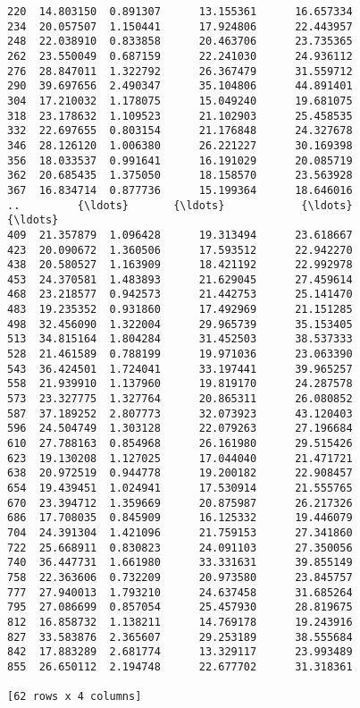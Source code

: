 \documentclass[11pt]{article}
\begin{document}
\begin{Verbatim}[commandchars=\\\{\}]
220  14.803150  0.891307      13.155361      16.657334
234  20.057507  1.150441      17.924806      22.443957
248  22.038910  0.833858      20.463706      23.735365
262  23.550049  0.687159      22.241030      24.936112
276  28.847011  1.322792      26.367479      31.559712
290  39.697656  2.490347      35.104806      44.891401
304  17.210032  1.178075      15.049240      19.681075
318  23.178632  1.109523      21.102903      25.458535
332  22.697655  0.803154      21.176848      24.327678
346  28.126120  1.006380      26.221227      30.169398
356  18.033537  0.991641      16.191029      20.085719
362  20.685435  1.375050      18.158570      23.563928
367  16.834714  0.877736      15.199364      18.646016
..         {\ldots}       {\ldots}            {\ldots}            {\ldots}
409  21.357879  1.096428      19.313494      23.618667
423  20.090672  1.360506      17.593512      22.942270
438  20.580527  1.163909      18.421192      22.992978
453  24.370581  1.483893      21.629045      27.459614
468  23.218577  0.942573      21.442753      25.141470
483  19.235352  0.931860      17.492969      21.151285
498  32.456090  1.322004      29.965739      35.153405
513  34.815164  1.804284      31.452503      38.537333
528  21.461589  0.788199      19.971036      23.063390
543  36.424501  1.724041      33.197441      39.965257
558  21.939910  1.137960      19.819170      24.287578
573  23.327775  1.327764      20.865311      26.080852
587  37.189252  2.807773      32.073923      43.120403
596  24.504749  1.303128      22.079263      27.196684
610  27.788163  0.854968      26.161980      29.515426
623  19.130208  1.127025      17.044040      21.471721
638  20.972519  0.944778      19.200182      22.908457
654  19.439451  1.024941      17.530914      21.555765
670  23.394712  1.359669      20.875987      26.217326
686  17.708035  0.845909      16.125332      19.446079
704  24.391304  1.421096      21.759153      27.341860
722  25.668911  0.830823      24.091103      27.350056
740  36.447731  1.661980      33.331631      39.855149
758  22.363606  0.732209      20.973580      23.845757
777  27.940013  1.793210      24.637458      31.685264
795  27.086699  0.857054      25.457930      28.819675
812  16.858732  1.138211      14.769178      19.243916
827  33.583876  2.365607      29.253189      38.555684
842  17.883289  2.681774      13.329117      23.993489
855  26.650112  2.194748      22.677702      31.318361

[62 rows x 4 columns]

    \end{Verbatim}
\end{document}
